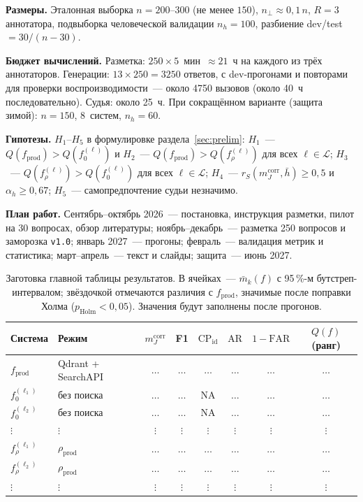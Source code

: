 \documentclass{article}
\newcommand{\Lm}{\mathcal{L}}
\newcommand{\fprod}{f_{\mathrm{prod}}}
\newcommand{\rprod}{\rho_{\mathrm{prod}}}
\newcommand{\refuse}{\bot}                          %
\newcommand{\NA}{\mathrm{NA}}
\newcommand{\CP}{\mathrm{CP}}
\newcommand{\AR}{\mathrm{AR}}
\newcommand{\FAR}{\mathrm{FAR}}
\newcommand{\mcorr}{m_J^{\mathrm{corr}}}
\newcommand{\rS}{r_{S}}
\begin{document}
\textbf{Размеры.} Эталонная выборка $n=200$--$300$ (не менее $150$), $n_{\refuse}\approx0{,}1\,n$, $R=3$ аннотатора, подвыборка человеческой валидации $n_h=100$, разбиение dev/test $=30/(n-30)$.

\textbf{Бюджет вычислений.} Разметка: $250\times5$~мин~$\approx21$~ч на каждого из трёх аннотаторов. Генерации: $13\times250=3250$ ответов, с dev-прогонами и повторами для проверки воспроизводимости~--- около 4750 вызовов (около 40~ч последовательно). Судья: около 25~ч. При сокращённом варианте (защита зимой): $n=150$, 8~систем, $n_h=60$.

\textbf{Гипотезы.} $H_1$--$H_5$ в формулировке раздела~\ref{sec:prelim}: $H_1$~--- $Q(\fprod)>Q(f_0^{(\ell)})$ и $H_2$~--- $Q(\fprod)>Q(f_\rho^{(\ell)})$ для всех $\ell\in\Lm$; $H_3$~--- $Q(f_\rho^{(\ell)})>Q(f_0^{(\ell)})$ для всех $\ell\in\Lm$; $H_4$~--- $\rS(\mcorr,\bar h)\ge0{,}5$ и $\alpha_h\ge0{,}67$; $H_5$~--- самопредпочтение судьи незначимо.

\textbf{План работ.} Сентябрь--октябрь 2026~--- постановка, инструкция разметки, пилот на 30 вопросах, обзор литературы; ноябрь--декабрь~--- разметка 250 вопросов и заморозка \texttt{v1.0}; январь 2027~--- прогоны; февраль~--- валидация метрик и статистика; март--апрель~--- текст и слайды; защита~--- июнь 2027.

\begin{table}[h]
  \caption{Заготовка главной таблицы результатов. В ячейках~--- $\bar m_k(f)$ с 95\,\%-м бутстреп-интервалом; звёздочкой отмечаются различия с $\fprod$, значимые после поправки Холма ($p_{\mathrm{Holm}}<0{,}05$). Значения будут заполнены после прогонов.}
  \label{tab:main}
  \centering
  \small
  \begin{tabular}{@{}llcccccc@{}}
    \toprule
    Система & Режим & $\mcorr$ & F1 & $\CP_{\mathrm{id}}$ & $\AR$ & $1-\FAR$ & $Q(f)$ (ранг) \\
    \midrule
    $\fprod$ & Qdrant + SearchAPI & $\dots$ & $\dots$ & $\dots$ & $\dots$ & $\dots$ & $\dots$ \\
    \midrule
    $f_0^{(\ell_1)}$ & без поиска & $\dots$ & $\dots$ & $\NA$ & $\dots$ & $\dots$ & $\dots$ \\
    $f_0^{(\ell_2)}$ & без поиска & $\dots$ & $\dots$ & $\NA$ & $\dots$ & $\dots$ & $\dots$ \\
    $\vdots$ & $\vdots$ & $\vdots$ & $\vdots$ & $\vdots$ & $\vdots$ & $\vdots$ & $\vdots$ \\
    \midrule
    $f_\rho^{(\ell_1)}$ & $\rprod$ & $\dots$ & $\dots$ & $\dots$ & $\dots$ & $\dots$ & $\dots$ \\
    $f_\rho^{(\ell_2)}$ & $\rprod$ & $\dots$ & $\dots$ & $\dots$ & $\dots$ & $\dots$ & $\dots$ \\
    $\vdots$ & $\vdots$ & $\vdots$ & $\vdots$ & $\vdots$ & $\vdots$ & $\vdots$ & $\vdots$ \\
    \bottomrule
  \end{tabular}
\end{table}
\end{document}
